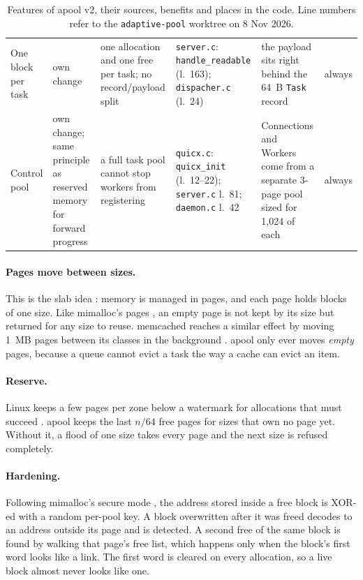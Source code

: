 \documentclass[10.5pt,a4paper]{article}
\newcommand{\file}[1]{\texttt{\small #1}}
\newcommand{\fn}[1]{\texttt{\small #1}}
\begin{document}
\begin{table}[ht]
\begin{tabularx}{\textwidth}{@{}L{2.25cm}L{2.3cm}YL{3.35cm}YL{1.15cm}@{}}
One block per task & own change & one allocation and one free per task; no record/payload split & \file{server.c}: \fn{handle\_readable} (l.~163); \file{dispacher.c} (l.~24) & the payload sits right behind the 64~B \texttt{Task} record & always \\
Control pool & own change; same principle as reserved memory for forward progress \citep{corbet2005ldd3} & a full task pool cannot stop workers from registering & \file{quicx.c}: \fn{quicx\_init} (l.~12--22); \file{server.c} l.~81; \file{daemon.c} l.~42 & Connections and Workers come from a separate 3-page pool sized for 1,024 of each & always \\
\bottomrule
\end{tabularx}
\caption{Features of apool v2, their sources, benefits and places in the code. Line numbers refer to the \texttt{adaptive-pool} worktree on 8 Nov 2026.}
\label{tab:features}
\end{table}

\paragraph{Pages move between sizes.} This is the slab idea \citep{bonwick1994slab}: memory is managed in pages, and each page holds blocks of one size. Like mimalloc's pages \citep{leijen2019mimalloc}, an empty page is not kept by its size but returned for any size to reuse. memcached reaches a similar effect by moving 1~MB pages between its classes in the background \citep{memcached1411}. apool only ever moves \emph{empty} pages, because a queue cannot evict a task the way a cache can evict an item.

\paragraph{Reserve.} Linux keeps a few pages per zone below a watermark for allocations that must succeed \citep{gorman2004vmm}. apool keeps the last $n/64$ free pages for sizes that own no page yet. Without it, a flood of one size takes every page and the next size is refused completely.

\paragraph{Hardening.} Following mimalloc's secure mode \citep{leijen2019mimalloc}, the address stored inside a free block is XOR-ed with a random per-pool key. A block overwritten after it was freed decodes to an address outside its page and is detected. A second free of the same block is found by walking that page's free list, which happens only when the block's first word looks like a link. The first word is cleared on every allocation, so a live block almost never looks like one.
\end{document}
